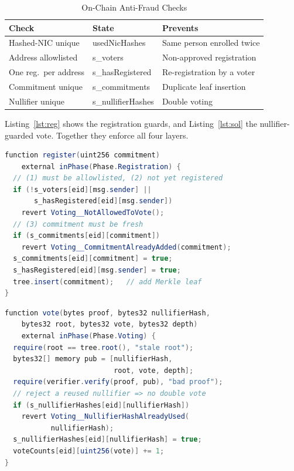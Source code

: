 \documentclass[conference]{IEEEtran}
\theoremstyle{definition}
\theoremstyle{plain}
\begin{document}
\begin{table}[t]
\caption{On-Chain Anti-Fraud Checks}
\centering\small
\begin{tabular}{@{}p{1.85cm}>{\scriptsize\ttfamily}p{2.55cm}p{2.35cm}@{}}
\toprule
\textbf{Check} & \normalfont\textbf{State} & \textbf{Prevents} \\
\midrule
Hashed-NIC unique & usedNicHashes & Same person enrolled twice \\
Address allowlisted & s\_voters & Non-approved registration \\
One reg.\ per address & s\_hasRegistered & Re-registration by a voter \\
Commitment unique & s\_commitments & Duplicate leaf insertion \\
Nullifier unique & s\_nullifierHashes & Double voting \\
\bottomrule
\end{tabular}
\label{tab:checks}
\end{table}

Listing~\ref{lst:reg} shows the registration guards, and Listing~\ref{lst:sol} the nullifier-guarded vote. Together they enforce all four layers.

\begin{lstlisting}[language=Java, caption={Registration guards (Solidity).}, label={lst:reg}]
function register(uint256 commitment)
    external inPhase(Phase.Registration) {
  // (1) must be allowlisted, (2) not yet registered
  if (!s_voters[eid][msg.sender] ||
       s_hasRegistered[eid][msg.sender])
    revert Voting__NotAllowedToVote();
  // (3) commitment must be fresh
  if (s_commitments[eid][commitment])
    revert Voting__CommitmentAlreadyAdded(commitment);
  s_commitments[eid][commitment] = true;
  s_hasRegistered[eid][msg.sender] = true;
  tree.insert(commitment);   // add Merkle leaf
}
\end{lstlisting}

\begin{lstlisting}[language=Java, caption={Nullifier-guarded vote (Solidity).}, label={lst:sol}]
function vote(bytes proof, bytes32 nullifierHash,
    bytes32 root, bytes32 vote, bytes32 depth)
    external inPhase(Phase.Voting) {
  require(root == tree.root(), "stale root");
  bytes32[] memory pub = [nullifierHash,
                          root, vote, depth];
  require(verifier.verify(proof, pub), "bad proof");
  // reject a reused nullifier => no double vote
  if (s_nullifierHashes[eid][nullifierHash])
    revert Voting__NullifierHashAlreadyUsed(
           nullifierHash);
  s_nullifierHashes[eid][nullifierHash] = true;
  voteCounts[eid][uint256(vote)] += 1;
}
\end{lstlisting}
\end{document}
